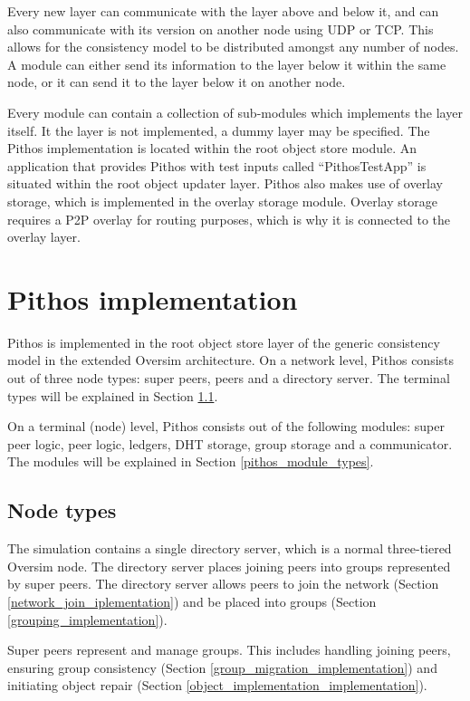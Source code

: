 Every new layer can communicate with the layer above and below it, and can also communicate with its version on another node using UDP or TCP. This allows for the consistency model to be distributed amongst any number of nodes. A module can either send its information to the layer below it within the same node, or it can send it to the layer below it on another node.

Every module can contain a collection of sub-modules which implements the layer itself. It the layer is not implemented, a dummy layer may be specified. The Pithos implementation is located within the root object store module. An application that provides Pithos with test inputs called ``PithosTestApp'' is situated within the root object updater layer. Pithos also makes use of overlay storage, which is implemented in the overlay storage module. Overlay storage requires a P2P overlay for routing purposes, which is why it is connected to the overlay layer.

\section{Pithos implementation}

Pithos is implemented in the root object store layer of the generic consistency model in the extended Oversim architecture. On a network level, Pithos consists out of three node types: super peers, peers and a directory server. The terminal types will be explained in Section \ref{pithos_node_types}.

On a terminal (node) level, Pithos consists out of the following modules: super peer logic, peer logic, ledgers, DHT storage, group storage and a communicator. The modules will be explained in Section \ref{pithos_module_types}.

\subsection{Node types}
\label{pithos_node_types}

The simulation contains a single directory server, which is a normal three-tiered Oversim node. The directory server places joining peers into groups represented by super peers. The directory server allows peers to join the network (Section \ref{network_join_iplementation}) and be placed into groups (Section \ref{grouping_implementation}).

Super peers represent and manage groups. This includes handling joining peers, ensuring group consistency (Section \ref{group_migration_implementation}) and initiating object repair (Section \ref{object_implementation_implementation}).

